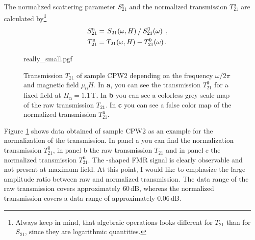 The normalized scattering parameter $S_{21}^\text{n}$ and the normalized transmission $T_{21}^\text{n}$ are calculated by\footnote{Always keep in mind, that algebraic operations looks different for $T_{21}$ than for $S_{21}$, since they are logarithmic quantities.}
\begin{align}
    {S}_{21}^\text{n}&=\left.{S_{21}(\omega,H)}\,\middle/\, {S_{21}^0(\omega)}\right.\,,\label{eq:normS21}\\
    {T}_{21}^\text{n}&=T_{21}(\omega,H)-T_{21}^0(\omega)\,.
\end{align}

\begin{figure}
    \centering
    {really_small.pgf}
    \caption[Raw and normalized transmission of sample CPW2]{Transmission $T_{21}$ of sample CPW2 depending on the frequency $\omega/2\pi$ and magnetic field $\mu_0H$. In \textbf{\color{antiseeblau100}a}, you can see the transmission $T_{21}^0$ for a fixed field at $H_\text{n}=1.1\,$T. In \textbf{\color{antiseeblau100}b} you can see a colorless grey scale map of the raw transmission $T_{21}$. In \textbf{\color{antiseeblau100}c} you can see a false color map of the normalized transmission $T_{21}^\text{n}$.}
    \label{fig:analysis_really_small}
\end{figure}
Figure \ref{fig:analysis_really_small} shows data obtained of sample CPW2 as an example for the normalization of the transmission. In panel a you can find the normalization transmission $T_{21}^0$, in panel b the raw transmission $T_{21}$ and in panel c the normalized transmission $T_{21}^\text{n}$. The -shaped FMR signal is clearly observable and not present at maximum field. At this point, I would like to emphasize the large amplitude ratio between raw and normalized transmission. The data range of the raw transmission covers approximately $60\,$dB, whereas the normalized transmission covers a data range of approximately $0.06\,$dB.

